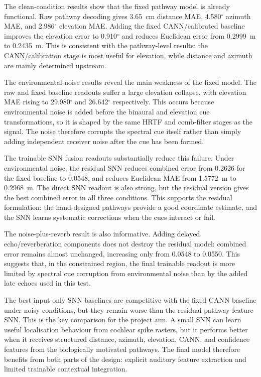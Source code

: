 The clean-condition results show that the fixed pathway model is already functional. Raw pathway decoding gives 3.65~cm distance MAE, 4.580$^\circ$ azimuth MAE, and 2.986$^\circ$ elevation MAE. Adding the fixed CANN/calibrated baseline improves the elevation error to 0.910$^\circ$ and reduces Euclidean error from 0.2999~m to 0.2435~m. This is consistent with the pathway-level results: the CANN/calibration stage is most useful for elevation, while distance and azimuth are mainly determined upstream.

The environmental-noise results reveal the main weakness of the fixed model. The raw and fixed baseline readouts suffer a large elevation collapse, with elevation MAE rising to 29.980$^\circ$ and 26.642$^\circ$ respectively. This occurs because environmental noise is added before the binaural and elevation cue transformations, so it is shaped by the same HRTF and comb-filter stages as the signal. The noise therefore corrupts the spectral cue itself rather than simply adding independent receiver noise after the cue has been formed.

The trainable SNN fusion readouts substantially reduce this failure. Under environmental noise, the residual SNN reduces combined error from 0.2626 for the fixed baseline to 0.0548, and reduces Euclidean MAE from 1.5772~m to 0.2968~m. The direct SNN readout is also strong, but the residual version gives the best combined error in all three conditions. This supports the residual formulation: the hand-designed pathways provide a good coordinate estimate, and the SNN learns systematic corrections when the cues interact or fail.

The noise-plus-reverb result is also informative. Adding delayed echo/reverberation components does not destroy the residual model: combined error remains almost unchanged, increasing only from 0.0548 to 0.0550. This suggests that, in the constrained region, the final trainable readout is more limited by spectral cue corruption from environmental noise than by the added late echoes used in this test.

The best input-only SNN baselines are competitive with the fixed CANN baseline under noisy conditions, but they remain worse than the residual pathway-feature SNN. This is the key comparison for the project aim. A small SNN can learn useful localisation behaviour from cochlear spike rasters, but it performs better when it receives structured distance, azimuth, elevation, CANN, and confidence features from the biologically motivated pathways. The final model therefore benefits from both parts of the design: explicit auditory feature extraction and limited trainable contextual integration.

